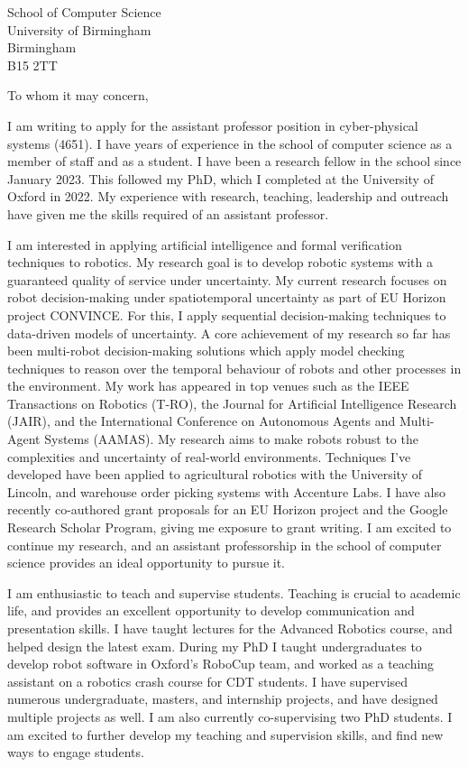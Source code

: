 \documentclass[12pt]{letter}
\begin{document}
\begin{letter}{School of Computer Science \\ University of Birmingham \\ Birmingham \\ B15 2TT}
\opening{To whom it may concern,}


I am writing to apply for the assistant professor position in cyber-physical systems (4651).
%
I have years of experience in the school of computer science as a member of staff and as a student.
%
I have been a research fellow in the school since January 2023.
%
This followed my PhD, which I completed at the University of Oxford in 2022.
%
My experience with research, teaching, leadership and outreach have given me the skills required of an assistant professor.



I am interested in applying artificial intelligence and formal verification techniques to robotics.
%
My research goal is to develop robotic systems with a guaranteed quality of service under uncertainty.
%
My current research focuses on robot decision-making under spatiotemporal uncertainty as part of EU Horizon project CONVINCE.
%
For this, I apply sequential decision-making techniques to data-driven models of uncertainty.
%
A core achievement of my research so far has been multi-robot decision-making solutions which apply model checking techniques to reason over the temporal behaviour of robots and other processes in the environment.
%
My work has appeared in top venues such as the IEEE Transactions on Robotics (T-RO), the Journal for Artificial Intelligence Research (JAIR), and the International Conference on Autonomous Agents and Multi-Agent Systems (AAMAS).
%
My research aims to make robots robust to the complexities and uncertainty of real-world environments.
%
Techniques I've developed have been applied to agricultural robotics with the University of Lincoln, and warehouse order picking systems with Accenture Labs.
%
I have also recently co-authored grant proposals for an EU Horizon project and the Google Research Scholar Program, giving me exposure to grant writing.
%
I am excited to continue my research, and an assistant professorship in the school of computer science provides an ideal opportunity to pursue it.

I am enthusiastic to teach and supervise students.
%
Teaching is crucial to academic life, and provides an excellent opportunity to develop communication and presentation skills.
%
I have taught lectures for the Advanced Robotics course, and helped design the latest exam.
%
During my PhD I taught undergraduates to develop robot software in Oxford's RoboCup team, and worked as a teaching assistant on a robotics crash course for CDT students.
%
I have supervised numerous undergraduate, masters, and internship projects, and have designed multiple projects as well.
%
I am also currently co-supervising two PhD students.
%
I am excited to further develop my teaching and supervision skills, and find new ways to engage students.


\end{letter}
\end{document}
